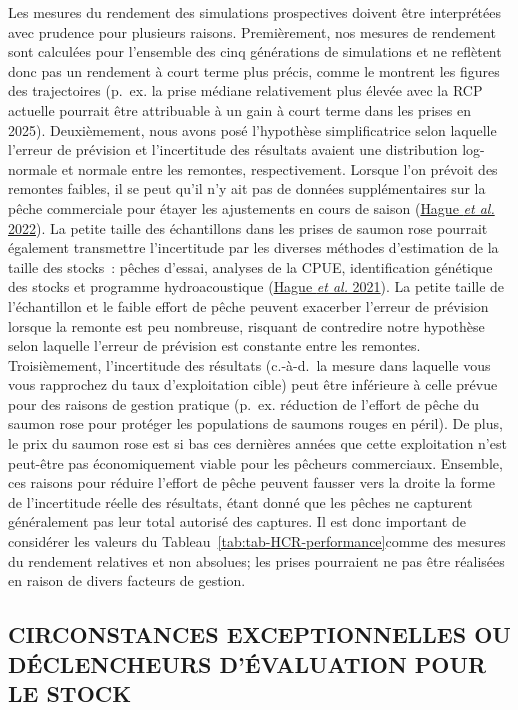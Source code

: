 \documentclass[french,11pt]{book}
\begin{document}
Les mesures du rendement des simulations prospectives doivent être interprétées avec prudence pour plusieurs raisons. Premièrement, nos mesures de rendement sont calculées pour l'ensemble des cinq générations de simulations et ne reflètent donc pas un rendement à court terme plus précis, comme le montrent les figures des trajectoires (p.~ex. la prise médiane relativement plus élevée avec la RCP actuelle pourrait être attribuable à un gain à court terme dans les prises en 2025). Deuxièmement, nous avons posé l'hypothèse simplificatrice selon laquelle l'erreur de prévision et l'incertitude des résultats avaient une distribution log-normale et normale entre les remontes, respectivement. Lorsque l'on prévoit des remontes faibles, il se peut qu'il n'y ait pas de données supplémentaires sur la pêche commerciale pour étayer les ajustements en cours de saison (\protect\hyperlink{ref-hagueImprovementsFraserRiver2022}{Hague \emph{et al.} 2022}). La petite taille des échantillons dans les prises de saumon rose pourrait également transmettre l'incertitude par les diverses méthodes d'estimation de la taille des stocks~: pêches d'essai, analyses de la CPUE, identification génétique des stocks et programme hydroacoustique (\protect\hyperlink{ref-hagueMovingTargetsAssessing2021}{Hague \emph{et al.} 2021}). La petite taille de l'échantillon et le faible effort de pêche peuvent exacerber l'erreur de prévision lorsque la remonte est peu nombreuse, risquant de contredire notre hypothèse selon laquelle l'erreur de prévision est constante entre les remontes. Troisièmement, l'incertitude des résultats (c.-à-d.~la mesure dans laquelle vous vous rapprochez du taux d'exploitation cible) peut être inférieure à celle prévue pour des raisons de gestion pratique (p.~ex. réduction de l'effort de pêche du saumon rose pour protéger les populations de saumons rouges en péril). De plus, le prix du saumon rose est si bas ces dernières années que cette exploitation n'est peut-être pas économiquement viable pour les pêcheurs commerciaux. Ensemble, ces raisons pour réduire l'effort de pêche peuvent fausser vers la droite la forme de l'incertitude réelle des résultats, étant donné que les pêches ne capturent généralement pas leur total autorisé des captures. Il est donc important de considérer les valeurs du Tableau~\ref{tab:tab-HCR-performance}comme des mesures du rendement relatives et non absolues; les prises pourraient ne pas être réalisées en raison de divers facteurs de gestion.

\hypertarget{circonstances-exceptionnelles-ou-duxe9clencheurs-duxe9valuation-pour-le-stock}{%
\subsection{CIRCONSTANCES EXCEPTIONNELLES OU DÉCLENCHEURS D'ÉVALUATION POUR LE STOCK}\label{circonstances-exceptionnelles-ou-duxe9clencheurs-duxe9valuation-pour-le-stock}}
\end{document}
